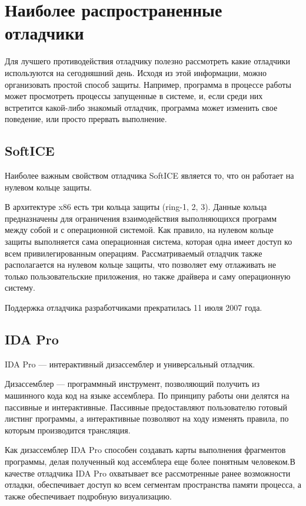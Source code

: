
\section{Наиболее распространенные отладчики}
Для лучшего противодействия отладчику полезно рассмотреть какие отладчики
используются на сегодняшний день. Исходя из этой информации, можно организовать
простой способ защиты. Например, программа в процессе работы может просмотреть
процессы запущенные в системе, и, если среди них встретится какой-либо знакомый
отладчик, программа может изменить свое поведение, или просто прервать
выполнение.

\subsection{SoftICE}
Наиболее важным свойством отладчика SoftICE является то, что он работает на
нулевом кольце защиты.

В архитектуре x86 есть три кольца защиты (ring-1, 2, 3).
Данные кольца предназначены для ограничения взаимодействия выполняющихся
программ между собой и с операционной системой. Как правило, на нулевом кольце
защиты выполняется сама операционная система, которая одна имеет доступ ко всем
привилегированным операциям. Рассматриваемый отладчик также располагается на
нулевом кольце защиты, что позволяет ему отлаживать не только пользовательские
приложения, но также драйвера и саму операционную систему.

Поддержка отладчика разработчиками прекратилась 11 июля 2007 года.

\subsection{IDA Pro}
IDA Pro --- интерактивный дизассемблер и универсальный отладчик. 

Дизассемблер --- программный инструмент, позволяющий получить из машинного кода
код на языке ассемблера. По принципу работы они делятся на пассивные и
интерактивные. Пассивные предоставляют пользователю готовый листинг программы, а
интерактивные позволяют на ходу изменять правила, по которым производится
трансляция.

Как дизассемблер IDA Pro способен создавать карты выполнения фрагментов
программы, делая полученный код ассемблера еще более понятным человеком.В
качестве отладчика IDA Pro охватывает все рассмотренные ранее возможности
отладки, обеспечивает доступ ко всем сегментам пространства памяти процесса, а
также обеспечивает подробную визуализацию.

